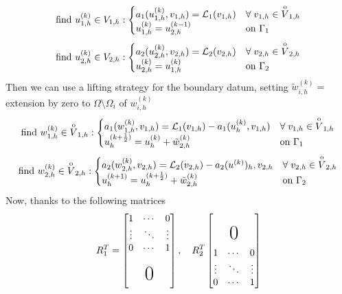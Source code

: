 \begin{equation*}
    \text{find } u^{(k)}_{1,h} \in V_{1,h} : \begin{cases}
        a_1(u^{(k)}_{1,h}, v_{1,h}) = \mathcal{L}_1 (v_{1,h}) & \forall \; v_{1,h} \in \overset{\mathrm{o}}{V}_{1,h} \\
        u^{(k)}_{1,h} = u^{(k-1)}_{2,h} & \text{on } \Gamma_1
    \end{cases}
\end{equation*}
\begin{equation*}
    \text{find } u^{(k)}_{2,h} \in V_{2,h} : \begin{cases}
        a_2(u^{(k)}_{2,h}, v_{2,h}) = \mathcal{L}_2 (v_{2,h}) & \forall \; v_{2,h} \in \overset{\mathrm{o}}{V}_{2,h} \\
        u^{(k)}_{2,h} = u^{(k)}_{1,h} & \text{on } \Gamma_2
    \end{cases}
\end{equation*}
Then we can use a lifting strategy for the boundary datum, setting \(\tilde{w}^{(k)}_{i,h} = \) extension by zero to \(\Omega \setminus \Omega_i\) of \(w^{(k)}_{i,h}\)
\begin{equation*}
    \text{find } w^{(k)}_{1,h} \in \overset{\mathrm{o}}{V}_{1,h} : \begin{cases}
        a_1(w^{(k)}_{1,h}, v_{1,h}) = \mathcal{L}_1 (v_{1,h}) - a_1(u^{(k)}_{h}, v_{1,h})& \forall \; v_{1,h} \in \overset{\mathrm{o}}{V}_{1,h} \\
        u^{(k+\frac{1}{2})}_{h} = u^{(k)}_{h} + \tilde{w}^{(k)}_{2,h} & \text{on } \Gamma_1
    \end{cases}
\end{equation*}
\begin{equation*}
    \text{find } w^{(k)}_{2,h} \in \overset{\mathrm{o}}{V}_{2,h} : \begin{cases}
        a_2(w^{(k)}_{2,h}, v_{2,h}) = \mathcal{L}_2 (v_{2,h}) -a_2(u^{(k)})_{h}, v_{2,h} & \forall \; v_{2,h} \in \overset{\mathrm{o}}{V}_{2,h} \\
        u^{(k+1)}_{h} = u^{(k+\frac{1}{2})}_{h} + \tilde{w}_{2,h}^{(k)} & \text{on } \Gamma_2
    \end{cases}
\end{equation*}
Now, thanks to the following matrices 
\[
    R_1^T = \left[ \begin{matrix}
        1 & \cdots & 0 \\
        \vdots & \ddots & \vdots \\
        0 & \cdots & 1 \\
        &  & \\
        & \makebox(0,0){\text{\huge0}} & \\
        & & 
    \end{matrix}  \right], \quad R_2^T \left[ \begin{matrix}
          &  & \\
        & \makebox(0,0){\text{\huge0}} & \\
        & & \\
        1 & \cdots & 0 \\
        \vdots & \ddots & \vdots \\
        0 & \cdots & 1       
    \end{matrix} \right]
\]
